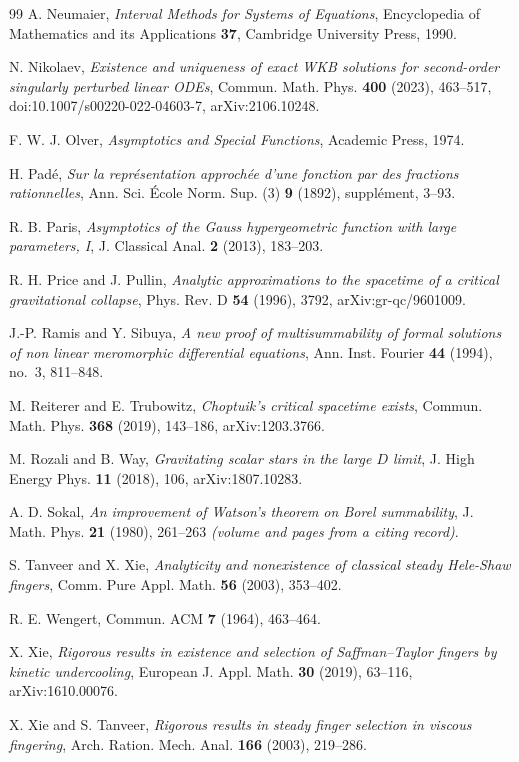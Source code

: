 \documentclass{amsart}
\numberwithin{equation}{section}
\theoremstyle{plain}
\theoremstyle{definition}
\theoremstyle{remark}
\begin{document}
\begin{thebibliography}{99}
 A. Neumaier, \emph{Interval Methods for Systems of Equations}, Encyclopedia of Mathematics and
its Applications \textbf{37}, Cambridge University Press, 1990.

 N. Nikolaev, \emph{Existence and uniqueness of exact WKB solutions for second-order singularly
perturbed linear ODEs}, Commun. Math. Phys. \textbf{400} (2023), 463--517, doi:10.1007/s00220-022-04603-7,
arXiv:2106.10248.

 F. W. J. Olver, \emph{Asymptotics and Special Functions}, Academic Press, 1974.

 H. Pad\'e, \emph{Sur la repr\'esentation approch\'ee d'une fonction par des fractions rationnelles},
Ann. Sci. \'Ecole Norm. Sup. (3) \textbf{9} (1892), suppl\'ement, 3--93.

 R. B. Paris, \emph{Asymptotics of the Gauss hypergeometric function with large parameters, I},
J. Classical Anal. \textbf{2} (2013), 183--203.

 R. H. Price and J. Pullin, \emph{Analytic approximations to the spacetime of a critical
gravitational collapse}, Phys. Rev. D \textbf{54} (1996), 3792, arXiv:gr-qc/9601009.

 J.-P. Ramis and Y. Sibuya, \emph{A new proof of multisummability of formal solutions of non
linear meromorphic differential equations}, Ann. Inst. Fourier \textbf{44} (1994), no.~3, 811--848.

 M. Reiterer and E. Trubowitz, \emph{Choptuik's critical spacetime exists}, Commun.
Math. Phys. \textbf{368} (2019), 143--186, arXiv:1203.3766.

 M. Rozali and B. Way, \emph{Gravitating scalar stars in the large $D$ limit}, J. High Energy
Phys. \textbf{11} (2018), 106, arXiv:1807.10283.

 A. D. Sokal, \emph{An improvement of Watson's theorem on Borel summability}, J. Math. Phys.
\textbf{21} (1980), 261--263 \emph{(volume and pages from a citing record)}.

 S. Tanveer and X. Xie, \emph{Analyticity and nonexistence of classical steady Hele-Shaw
fingers}, Comm. Pure Appl. Math. \textbf{56} (2003), 353--402.

 R. E. Wengert, Commun. ACM \textbf{7} (1964), 463--464.

 X. Xie, \emph{Rigorous results in existence and selection of Saffman--Taylor fingers by kinetic
undercooling}, European J. Appl. Math. \textbf{30} (2019), 63--116, arXiv:1610.00076.

 X. Xie and S. Tanveer, \emph{Rigorous results in steady finger selection in viscous
fingering}, Arch. Ration. Mech. Anal. \textbf{166} (2003), 219--286.

\end{thebibliography}
\end{document}
